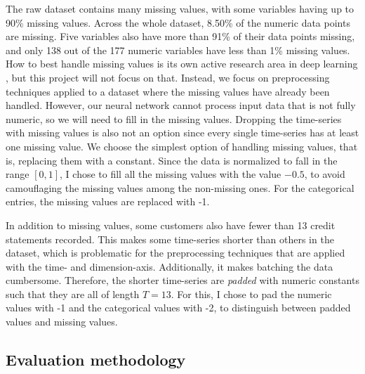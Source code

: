 \documentclass{statsmsc}
\begin{document}
{The raw dataset contains many missing values, with some variables having up to 90\% missing
values.  Across the whole dataset, 8.50\% of the numeric data points are
missing. Five variables also have more than 91\% of their data points missing,
and only 138 out of the 177 numeric variables have less than 1\% missing
values. How to best handle missing values is its own active research area in deep learning
\citep{weerakody2023,brits}, but this project will not focus on that.  Instead, we
focus on preprocessing techniques applied to a dataset where the missing values
have already been handled. However, our neural network cannot process input
data that is not fully numeric, so we will need to fill in the missing values.
Dropping the time-series with missing values is also not an option
since every single time-series has at least one missing value. We choose the simplest
option of handling missing values, that is, replacing them with a constant.
Since the data is normalized to fall in the range
$[0,1]$, I chose to fill all the missing values with the value $-0.5$, to avoid
camouflaging the missing values among the non-missing ones.
For the categorical entries, the missing values are replaced with -1.

In addition to missing values, some customers also have fewer than 13 credit
statements recorded. This makes some time-series shorter than others in the
dataset, which is problematic for the preprocessing techniques that are applied
with the time- and dimension-axis.  Additionally, it makes batching the data
cumbersome. Therefore, the shorter time-series are \textit{padded} with numeric
constants such that they are all of length $T=13$. For this, I chose to pad the
numeric values with -1 and the categorical values with -2, to distinguish between
padded values and missing values.


\subsection{Evaluation methodology}%
\label{sec:amex_meth}

}
\end{document}
